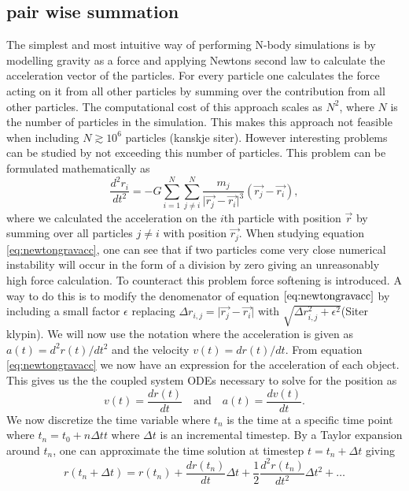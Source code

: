 \subsection{pair wise summation}
The simplest and most intuitive way of performing N-body simulations is by
modelling gravity as a force and applying Newtons second law to calculate the
acceleration vector of the particles. For every particle one calculates the
force acting on it from all other particles by summing over the contribution
from all other particles. The computational cost of this approach scales as
$N^2$, where $N$ is the number of particles in the simulation. This makes this
approach not feasible when including $N\gtrsim10^6$ particles (kanskje siter). However
interesting problems can be studied by not exceeding this number of particles. This problem can be formulated mathematically as
\begin{equation}\label{eq:newtongravacc}
    \frac{d^2r_i}{dt^2}=-G\sum_{i=1}^{N}\sum_{j\neq i}^N\frac{m_j}{\vert\vec{r_j}-\vec{r_i}\vert^3}(\vec{r_j}-\vec{r_i}),
\end{equation}
where we calculated the acceleration on the $i$th particle with position
$\vec{r}$ by summing over all particles $j\neq i$ with position $\vec{r_j}$.
When studying equation \ref{eq:newtongravacc}, one can see that if two particles
come very close numerical instability will occur in the form of a division by
zero giving an unreasonably high force calculation. To counteract this problem
force softening is introduced. A way to do this is to modify the denomenator of
equation $\ref{eq:newtongravacc}$ by including a small factor $\epsilon$
replacing $\Delta r_{i,j}=\vert\vec{r_j}-\vec{r_i}\vert$ with $\sqrt{\Delta
r_{i,j}^2+\epsilon^2}$(Siter klypin). We will now use the notation where the acceleration is
given as $a(t)=d^2r(t)/dt^2$ and the velocity $v(t)=dr(t)/dt$.
From equation \ref{eq:newtongravacc} we now have an expression for the acceleration of each object.
This gives us the the coupled system ODEs necessary to solve for the position as
\begin{equation}
    v(t)=\frac{dr(t)}{dt} \quad\mathrm{and}\quad a(t)=\frac{dv(t)}{dt}.
\end{equation}
We now discretize the time variable where $t_n$ is the time at a specific
time point where $t_n=t_0+n\Delta t t$ where $\Delta t$ is an incremental
timestep. By a Taylor expansion around $t_n$, one can approximate the time
solution at timestep $t=t_n+\Delta t$ giving
\begin{equation}
    r(t_n+\Delta t) = r(t_n) + \frac{dr(t_n)}{dt}\Delta t + \frac{1}{2}\frac{d^2r(t_n)}{dt^2}\Delta t^2 +\ldots
\end{equation}
